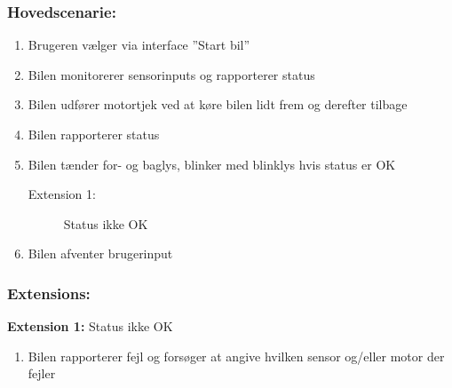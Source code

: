 \begin{framed}
	\subsubsection*{Hovedscenarie:}
		\begin{enumerate}
			\item Brugeren vælger via interface ''Start bil''
			\item Bilen monitorerer sensorinputs og rapporterer status 
			\item Bilen udfører motortjek ved at køre bilen lidt frem og derefter tilbage
			\item Bilen rapporterer status
			\item Bilen tænder for- og baglys, blinker med blinklys hvis status er OK 
			\begin{description}
					\item[Extension 1:] Status ikke OK
			\end{description}
			\item Bilen afventer brugerinput
		\end{enumerate}
	
	\subsubsection*{Extensions:}
	\textbf{Extension 1:} Status ikke OK	%
		\begin{enumerate}
			\item Bilen rapporterer fejl og forsøger at angive hvilken sensor og/eller motor der fejler
		\end{enumerate}
	
\end{framed}
	

